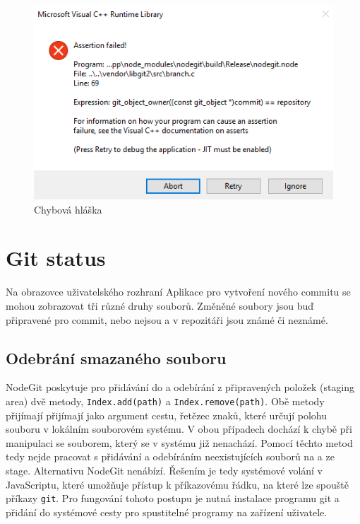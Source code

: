 \FloatBarrier
\begin{figure}[h]
	\centering
	\includegraphics[width=\textwidth]{sections/nodegit/images/branch.png}
	\caption{Chybová hláška}
\end{figure}
\FloatBarrier

\section{Git status}

Na obrazovce uživatelského rozhraní Aplikace pro vytvoření nového commitu se mohou zobrazovat tři různé druhy souborů. Změněné soubory jsou buď připravené pro commit, nebo nejsou a v repozitáři jsou známé či neznámé.

\subsection{Odebrání smazaného souboru}

NodeGit poskytuje pro přidávání do a odebírání z připravených položek (staging area) dvě metody, \texttt{Index.add(path)} a \texttt{Index.remove(path)}. Obě metody přijímají přijímají jako argument cestu, řetězec znaků, které určují polohu souboru v lokálním souborovém systému. V obou případech dochází k chybě při manipulaci se souborem, který se v systému již nenachází. Pomocí těchto metod tedy nejde pracovat s přidávání a odebíráním neexistujících souborů na a ze stage. Alternativu NodeGit nenábízí. Řešením je tedy systémové volání v JavaScriptu, které umožňuje přístup k příkazovému řádku, na které lze spouště příkazy \texttt{git}. Pro fungování tohoto postupu je nutná instalace programu git a přidání do systémové cesty pro spustitelné programy na zařízení uživatele.

